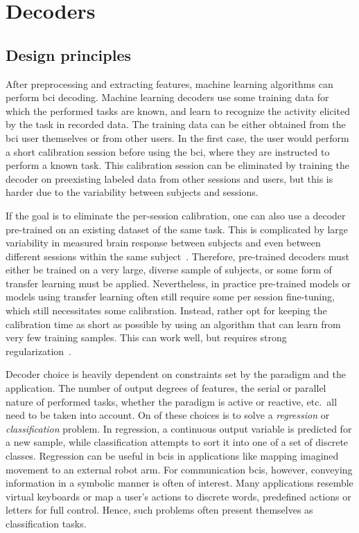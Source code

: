 \section{Decoders}%
\label{sec:bci/decoding}

\subsection{Design principles}

After preprocessing and extracting features, machine learning algorithms can perform \ac{bci}
decoding.
Machine learning decoders use some training data for which the performed tasks
are known, and learn to recognize the activity elicited by the task in recorded data.
The training data can be either obtained from the \ac{bci} user themselves or from
other users.
In the first case, the user would perform a short calibration session before
using the \ac{bci}, where they are instructed to perform a known task.
This calibration session can be eliminated by training the decoder on
preexisting labeled data from other sessions and users, but this is harder due
to the variability between subjects and sessions.

If the goal is to eliminate the per-session calibration, one can also use a
decoder pre-trained on an existing dataset of the same task.
This is complicated by large variability in measured brain response between subjects
and even between different sessions within the same
subject~\cite{Guger2009,Saha2020}.
Therefore, pre-trained decoders must either be trained on a very large, diverse
sample of subjects, or some form of transfer learning must be applied.
Nevertheless, in practice pre-trained models or models using transfer learning often still
require some per session fine-tuning, which still necessitates some
calibration.
Instead, rather opt for keeping the calibration time as short as possible by using
an algorithm that can learn from very few training samples.
This can work well, but requires strong regularization~\cite{VanDenKerchove2022}.

Decoder choice is heavily dependent on constraints set by the paradigm and the
application.
The number of output degrees of features, the serial or parallel nature of
performed tasks, whether the paradigm is active or reactive, etc.\ all need to
be taken into account.
On of these choices is to solve a \emph{regression} or \emph{classification}
problem.
In regression, a continuous output variable is predicted for a new sample,
while classification attempts to sort it into one of a set of discrete classes.
Regression can be useful in \acp{bci} in applications like mapping imagined
movement to an external robot arm.
For communication \acp{bci}, however, conveying information in a symbolic
manner is often of interest.
Many applications resemble virtual keyboards or map a user's actions to
discrete words, predefined actions or letters for full control.
Hence, such problems often present themselves as classification tasks.

